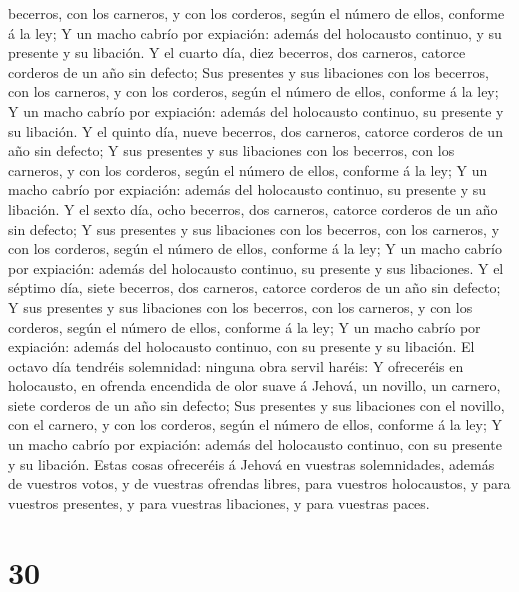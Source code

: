 becerros, con los carneros, y con los corderos, según el número de
ellos, conforme á la ley;  Y un macho cabrío por expiación:
además del holocausto continuo, y su presente y su libación.
 Y el cuarto día, diez becerros, dos carneros, catorce
corderos de un año sin defecto;  Sus presentes y sus
libaciones con los becerros, con los carneros, y con los corderos, según
el número de ellos, conforme á la ley;  Y un macho cabrío
por expiación: además del holocausto continuo, su presente y su
libación.  Y el quinto día, nueve becerros, dos carneros,
catorce corderos de un año sin defecto;  Y sus presentes y
sus libaciones con los becerros, con los carneros, y con los corderos,
según el número de ellos, conforme á la ley;  Y un macho
cabrío por expiación: además del holocausto continuo, su presente y su
libación.  Y el sexto día, ocho becerros, dos carneros,
catorce corderos de un año sin defecto;  Y sus presentes y
sus libaciones con los becerros, con los carneros, y con los corderos,
según el número de ellos, conforme á la ley;  Y un macho
cabrío por expiación: además del holocausto continuo, su presente y sus
libaciones.  Y el séptimo día, siete becerros, dos
carneros, catorce corderos de un año sin defecto;  Y sus
presentes y sus libaciones con los becerros, con los carneros, y con los
corderos, según el número de ellos, conforme á la ley;  Y
un macho cabrío por expiación: además del holocausto continuo, con su
presente y su libación.  El octavo día tendréis solemnidad:
ninguna obra servil haréis:  Y ofreceréis en holocausto, en
ofrenda encendida de olor suave á Jehová, un novillo, un carnero, siete
corderos de un año sin defecto;  Sus presentes y sus
libaciones con el novillo, con el carnero, y con los corderos, según el
número de ellos, conforme á la ley;  Y un macho cabrío por
expiación: además del holocausto continuo, con su presente y su
libación.  Estas cosas ofreceréis á Jehová en vuestras
solemnidades, además de vuestros votos, y de vuestras ofrendas libres,
para vuestros holocaustos, y para vuestros presentes, y para vuestras
libaciones, y para vuestras paces. 

\hypertarget{section-29}{%
\section{30}\label{section-29}}

